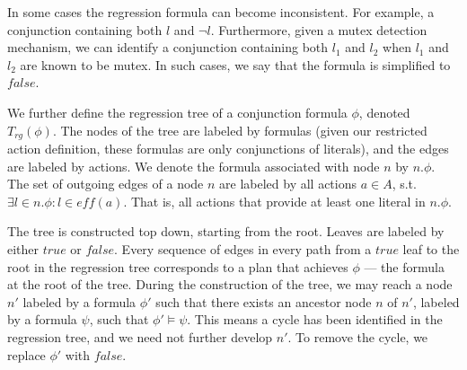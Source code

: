 \documentclass[letterpaper]{article}
\newcommand\roni[1]{\textcolor{blue}{roni: #1}}
\newcommand\guy[1]{\textcolor{red}{guy: #1}}
\theoremstyle{definition}
\begin{document}
In some cases the regression formula can become inconsistent. For example, a conjunction containing both $l$ and $\neg l$. Furthermore, given a mutex detection mechanism, we can identify a conjunction containing both $l_1$ and $l_2$ when $l_1$ and $l_2$ are known to be mutex. In such cases, we say that the formula is simplified to $false$. 

We further define the regression tree of a conjunction formula $\phi$, denoted $T_{rg}(\phi)$. The nodes of the tree are labeled by formulas (given our restricted action definition, these formulas are only conjunctions of literals), and the edges are labeled by actions. We denote the formula associated with node $n$ by $n.\phi$. The set of outgoing edges of a node $n$ are labeled by all actions $a \in A$, s.t. $\exists l \in n.\phi : l \in eff(a)$. That is, all actions that provide at least one literal in $n.\phi$. %

The tree is constructed top down, starting from the root. Leaves are labeled by either $true$ or $false$. Every sequence of edges in every path from a $true$ leaf to the root in the regression tree corresponds to a plan that achieves $\phi$ --- the formula at the root of the tree. During the construction of the tree, we may reach a node $n'$ labeled by a formula $\phi'$ such that there exists an ancestor node $n$ of $n'$, labeled by a formula $\psi$, such that $\phi' \models \psi$. This means a cycle has been identified in the regression tree, and we need not further develop $n'$. To remove the cycle, we replace $\phi'$ with $false$. 






\end{document}
